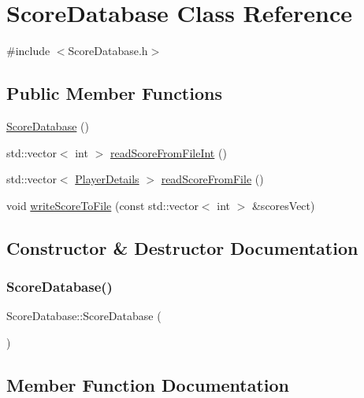 \hypertarget{class_score_database}{}\section{Score\+Database Class Reference}
\label{class_score_database}


{\ttfamily \#include $<$Score\+Database.\+h$>$}

\subsection*{Public Member Functions}
\begin{DoxyCompactItemize}
\item 
\hyperlink{class_score_database_a468f42e360810528ffc4aebdfac44694}{Score\+Database} ()
\item 
std\+::vector$<$ int $>$ \hyperlink{class_score_database_a64030d31fa7a362d17de1172fed3189f}{read\+Score\+From\+File\+Int} ()
\item 
std\+::vector$<$ \hyperlink{struct_player_details}{Player\+Details} $>$ \hyperlink{class_score_database_af8a707a19aa762bce143038e00029e65}{read\+Score\+From\+File} ()
\item 
void \hyperlink{class_score_database_a8e479ebb5c08413a4f34c9b0d019ff0e}{write\+Score\+To\+File} (const std\+::vector$<$ int $>$ \&scores\+Vect)
\end{DoxyCompactItemize}


\subsection{Constructor \& Destructor Documentation}
\mbox{\label{class_score_database_a468f42e360810528ffc4aebdfac44694}} 
\subsubsection{\texorpdfstring{Score\+Database()}{ScoreDatabase()}}
{\footnotesize\ttfamily Score\+Database\+::\+Score\+Database (\begin{DoxyParamCaption}{ }\end{DoxyParamCaption})}



\subsection{Member Function Documentation}
\mbox{\label{class_score_database_af8a707a19aa762bce143038e00029e65}} 
